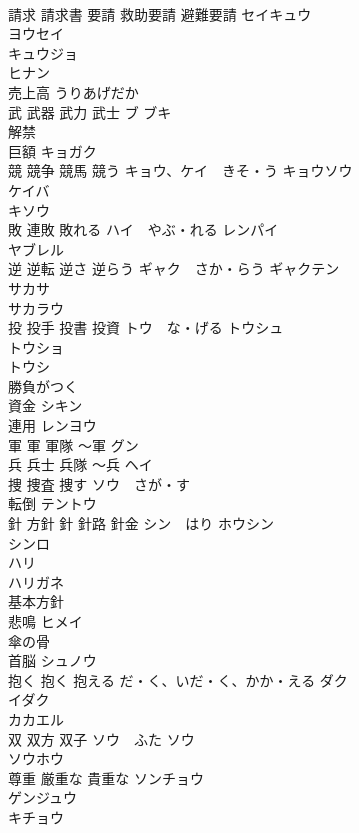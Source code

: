 \documentclass[8pt]{extreport}
\begin{document}
\begin{CJK}{UTF8}{min}
\\	請求 請求書 要請 救助要請 避難要請	セイキュウ
\\	ヨウセイ 
\\	キュウジョ 
\\	ヒナン 
\\	売上高	うりあげだか 
\\	武 武器 武力 武士	ブ ブキ 
\\	解禁	
\\	巨額	キョガク 
\\	競 競争 競馬 競う	キョウ、ケイ　きそ・う キョウソウ 
\\	ケイバ 
\\	キソウ 
\\	敗 連敗 敗れる	ハイ　やぶ・れる レンパイ 
\\	ヤブレル
\\	逆 逆転 逆さ 逆らう	ギャク　さか・らう ギャクテン 
\\	サカサ 
\\	サカラウ 
\\	投 投手 投書 投資	トウ　な・げる トウシュ 
\\	トウショ 
\\	トウシ　
\\	勝負がつく	
\\	資金	シキン 
\\	連用	レンヨウ 
\\	軍 軍 軍隊 〜軍	グン 
\\	兵 兵士 兵隊 〜兵	ヘイ 
\\	捜 捜査 捜す	ソウ　さが・す 
\\	転倒	テントウ 
\\	針 方針 針 針路 針金	シン　はり ホウシン 
\\	シンロ 
\\	ハリ 
\\	ハリガネ 
\\	基本方針	
\\	悲鳴	ヒメイ 
\\	傘の骨	
\\	首脳	シュノウ 
\\	抱く 抱く 抱える	だ・く、いだ・く、かか・える ダク 
\\	イダク　
\\	カカエル 
\\	双 双方 双子	ソウ　ふた ソウ 
\\	ソウホウ 
\\	尊重 厳重な 貴重な	ソンチョウ 
\\	ゲンジュウ 
\\	キチョウ　

\end{CJK}
\end{document}
